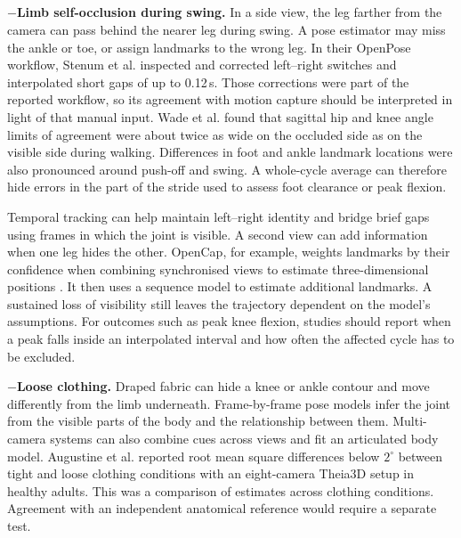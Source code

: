 \documentclass[12pt,nopreprintline]{elsarticle}
\begin{document}
\subsection{}
\label{sec:recording_robustness}
\begin{redrevision}
$-$\noindent\textbf{Limb self-occlusion during swing.}
In a side view, the leg farther from the camera can pass behind the nearer leg during swing. A pose estimator may miss the ankle or toe, or assign landmarks to the wrong leg. In their OpenPose workflow, Stenum et al. \cite{stenum2021two} inspected and corrected left--right switches and interpolated short gaps of up to 0.12\,s. Those corrections were part of the reported workflow, so its agreement with motion capture should be interpreted in light of that manual input. Wade et al. \cite{wade2023examination} found that sagittal hip and knee angle limits of agreement were about twice as wide on the occluded side as on the visible side during walking. Differences in foot and ankle landmark locations were also pronounced around push-off and swing. A whole-cycle average can therefore hide errors in the part of the stride used to assess foot clearance or peak flexion.

Temporal tracking can help maintain left--right identity and bridge brief gaps using frames in which the joint is visible. A second view can add information when one leg hides the other. OpenCap, for example, weights landmarks by their confidence when combining synchronised views to estimate three-dimensional positions \cite{uhlrich2023opencap}. It then uses a sequence model to estimate additional landmarks. A sustained loss of visibility still leaves the trajectory dependent on the model's assumptions. For outcomes such as peak knee flexion, studies should report when a peak falls inside an interpolated interval and how often the affected cycle has to be excluded.

$-$\noindent\textbf{Loose clothing.}
Draped fabric can hide a knee or ankle contour and move differently from the limb underneath. Frame-by-frame pose models infer the joint from the visible parts of the body and the relationship between them. Multi-camera systems can also combine cues across views and fit an articulated body model. Augustine et al. \cite{augustine2025clothing} reported root mean square differences below \(2^\circ\) between tight and loose clothing conditions with an eight-camera Theia3D setup in healthy adults. This was a comparison of estimates across clothing conditions. Agreement with an independent anatomical reference would require a separate test.


\end{redrevision}
\end{document}
